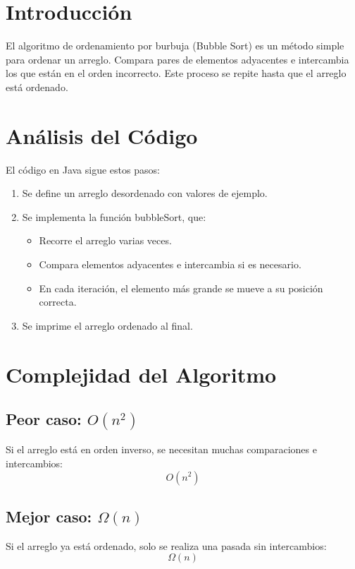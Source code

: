 \documentclass{article}
\begin{document}
	\newpage
	
	


		\section{Introducción}
		El algoritmo de ordenamiento por burbuja (Bubble Sort) es un método simple para ordenar un arreglo. Compara pares de elementos adyacentes e intercambia los que están en el orden incorrecto. Este proceso se repite hasta que el arreglo está ordenado.
		
		\section{Análisis del Código}
		El código en Java sigue estos pasos:
		\begin{enumerate}
			\item Se define un arreglo desordenado con valores de ejemplo.
			\item Se implementa la función bubbleSort, que:
			\begin{itemize}
				\item Recorre el arreglo varias veces.
				\item Compara elementos adyacentes e intercambia si es necesario.
				\item En cada iteración, el elemento más grande se mueve a su posición correcta.
			\end{itemize}
			\item Se imprime el arreglo ordenado al final.
		\end{enumerate}
		
		\section{Complejidad del Algoritmo}
		\subsection*{Peor caso: \(O(n^2)\)}
		Si el arreglo está en orden inverso, se necesitan muchas comparaciones e intercambios:
		\begin{equation}
			O(n^2)
		\end{equation}
		
		\subsection*{Mejor caso: \(\Omega(n)\)}
		Si el arreglo ya está ordenado, solo se realiza una pasada sin intercambios:
		\begin{equation}
			\Omega(n)
		\end{equation}
		
\end{document}
